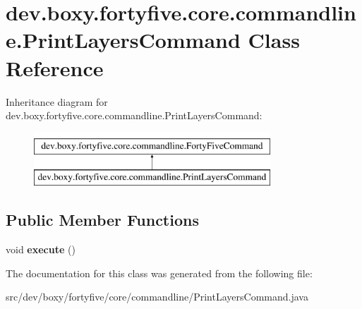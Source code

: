 \hypertarget{classdev_1_1boxy_1_1fortyfive_1_1core_1_1commandline_1_1_print_layers_command}{
\section{dev.boxy.fortyfive.core.commandline.PrintLayersCommand Class Reference}
\label{d2/d55/classdev_1_1boxy_1_1fortyfive_1_1core_1_1commandline_1_1_print_layers_command}
}
Inheritance diagram for dev.boxy.fortyfive.core.commandline.PrintLayersCommand:\begin{figure}[H]
\begin{center}
\leavevmode
\includegraphics[height=2.000000cm]{d2/d55/classdev_1_1boxy_1_1fortyfive_1_1core_1_1commandline_1_1_print_layers_command}
\end{center}
\end{figure}
\subsection*{Public Member Functions}
\begin{DoxyCompactItemize}
\item 
\hypertarget{classdev_1_1boxy_1_1fortyfive_1_1core_1_1commandline_1_1_print_layers_command_a46b47a742130088280d581cb59b22e81}{
void {\bfseries execute} ()}
\label{d2/d55/classdev_1_1boxy_1_1fortyfive_1_1core_1_1commandline_1_1_print_layers_command_a46b47a742130088280d581cb59b22e81}

\end{DoxyCompactItemize}


The documentation for this class was generated from the following file:\begin{DoxyCompactItemize}
\item 
src/dev/boxy/fortyfive/core/commandline/PrintLayersCommand.java\end{DoxyCompactItemize}
